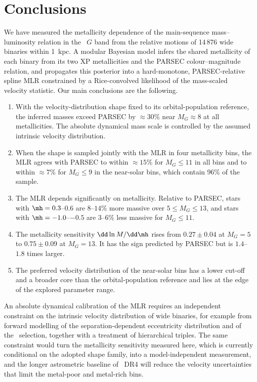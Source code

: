\section{Conclusions}
\label{sec:conclusions}

We have measured the metallicity dependence of the main-sequence
mass--luminosity relation in the \gaia\ $G$ band from the relative motions of
14\,876 wide binaries within 1~kpc.  A modular Bayesian model infers the
shared metallicity of each binary from its two XP metallicities and the
PARSEC colour--magnitude relation, and propagates this posterior into a
hard-monotone, PARSEC-relative spline MLR constrained by a Rice-convolved
likelihood of the mass-scaled velocity statistic.  Our main conclusions are
the following.

\begin{enumerate}
\item With the velocity-distribution shape fixed to its orbital-population
reference, the inferred masses exceed PARSEC by $\approx30$\% near
$M_G\approx8$ at all metallicities.  The absolute dynamical mass scale is
controlled by the assumed intrinsic velocity distribution.
\item When the shape is sampled jointly with the MLR in four metallicity
bins, the MLR agrees with PARSEC to within $\approx15$\% for $M_G\le11$ in all
bins and to within $\approx7$\% for $M_G\le9$ in the near-solar bins, which
contain 96\% of the sample.
\item The MLR depends significantly on metallicity.  Relative to PARSEC,
stars with $\mh=0.3$--$0.6$ are $8$--$14$\% more massive over
$5\le M_G\le13$, and stars with $\mh=-1.0$--$-0.5$ are $3$--$6$\% less
massive for $M_G\le11$.
\item The metallicity sensitivity $\dd\ln M/\dd\mh$ rises from $0.27\pm0.04$
at $M_G=5$ to $0.75\pm0.09$ at $M_G=13$.  It has the sign predicted by
PARSEC but is $1.4$--$1.8$ times larger.
\item The preferred velocity distribution of the near-solar bins has a lower
cut-off and a broader core than the orbital-population reference and lies
at the edge of the explored parameter range.
\end{enumerate}

An absolute dynamical calibration of the MLR requires an independent
constraint on the intrinsic velocity distribution of wide binaries, for
example from forward modelling of the separation-dependent eccentricity
distribution and of the \gaia\ selection, together with a treatment of
hierarchical triples.  The same constraint would turn the metallicity
sensitivity measured here, which is currently conditional on the adopted
shape family, into a model-independent measurement, and the longer
astrometric baseline of \gaia\ DR4 will reduce the velocity uncertainties
that limit the metal-poor and metal-rich bins.
